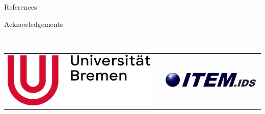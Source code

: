 \documentclass[final]{beamer}
\newlength{\onecolwid}
\begin{document}
\begin{frame}[t]
\begin{columns}[t]
\begin{column}{\onecolwid}

\begin{block}{References}

\nocite{*} %
\small{
\vspace{0.75in}}

\end{block}



\begin{block}{Acknowledgements}

\small{} \\

\end{block}


\begin{center}
\begin{tabular}{ccc}
\includegraphics[width=0.4\linewidth]{../figures/logo_ub_2021.png} & \hfill & \includegraphics[width=0.4\linewidth]{../figures/logo_item_ids.png}
\end{tabular}
\end{center}


\end{column} %

\end{columns} %

\end{frame} %
\end{document}
